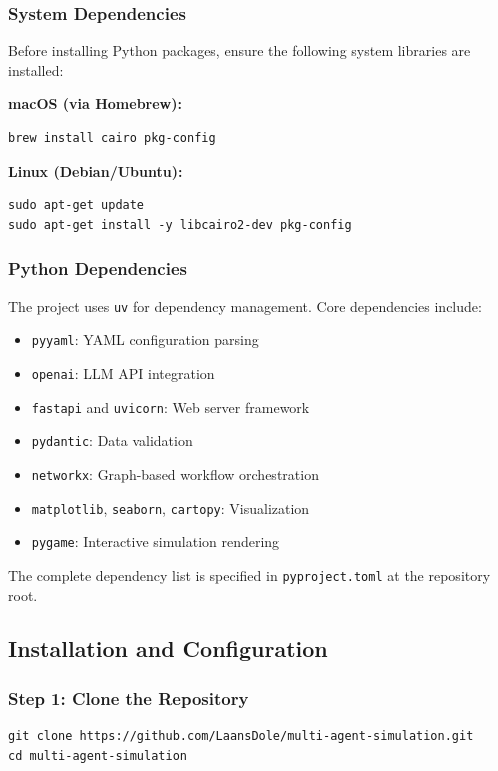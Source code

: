 \subsubsection{System Dependencies}

Before installing Python packages, ensure the following system libraries are installed:

\textbf{macOS (via Homebrew):}
\begin{verbatim}
brew install cairo pkg-config
\end{verbatim}

\textbf{Linux (Debian/Ubuntu):}
\begin{verbatim}
sudo apt-get update
sudo apt-get install -y libcairo2-dev pkg-config
\end{verbatim}

\subsubsection{Python Dependencies}

The project uses \texttt{uv} for dependency management. Core dependencies include:
\begin{itemize}
    \item \texttt{pyyaml}: YAML configuration parsing
    \item \texttt{openai}: LLM API integration
    \item \texttt{fastapi} and \texttt{uvicorn}: Web server framework
    \item \texttt{pydantic}: Data validation
    \item \texttt{networkx}: Graph-based workflow orchestration
    \item \texttt{matplotlib}, \texttt{seaborn}, \texttt{cartopy}: Visualization
    \item \texttt{pygame}: Interactive simulation rendering
\end{itemize}

The complete dependency list is specified in \texttt{pyproject.toml} at the repository root.

\subsection{Installation and Configuration}

\subsubsection{Step 1: Clone the Repository}
\begin{verbatim}
git clone https://github.com/LaansDole/multi-agent-simulation.git
cd multi-agent-simulation
\end{verbatim}

